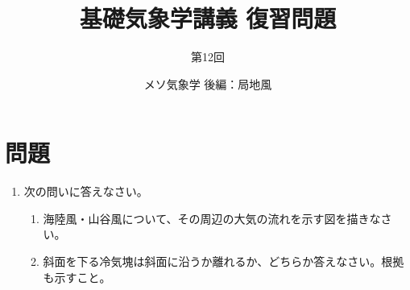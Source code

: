 \documentclass{jsarticle}
\newenvironment{problems}
{
  \renewcommand\labelenumi{\doublebox{\arabic{enumi}}}
  \begin{enumerate}
}{
  \end{enumerate}
  \renewcommand\labelenumi{\arabic{enumi}.}
}
\begin{document}
\title{基礎気象学講義 復習問題} %
\author{第12回} %
\date{メソ気象学 後編：局地風} %
\maketitle

\section{問題}

    \begin{problems}
    \item 次の問いに答えなさい。
        \begin{enumerate}[(1)]
        \item 海陸風・山谷風について、その周辺の大気の流れを示す図を描きなさい。
        \item 斜面を下る冷気塊は斜面に沿うか離れるか、どちらか答えなさい。根拠も示すこと。\\
        \end{enumerate}


\end{problems}
\end{document}
